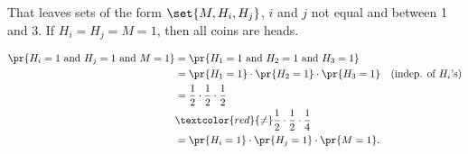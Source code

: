 \begin{problem}
\begin{solution}
  That leaves sets of the form $\set{M, H_i, H_j}$, $i$ and $j$ not equal
  and between 1 and 3.  If $H_i = H_j = M = 1$, then all coins are heads.

\begin{align*}
\pr{H_i=1 \text{ and } H_j = 1 \text{ and } M=1} & = \pr{H_1=1 \text{ and } H_2 = 1 \text{ and } H_3 =1}\\
    & = \pr{H_1=1}\cdot \pr{H_2 = 1} \cdot \pr{H_3 = 1}  & \text{(indep. of $H_i$'s)}\\
    & = \frac{1}{2} \cdot  \frac{1}{2} \cdot \frac{1}{2}\\
    & \textcolor{red}{\neq} \frac{1}{2} \cdot  \frac{1}{2} \cdot \frac{1}{4}\\
    & = \pr{H_i=1}\cdot \pr{H_j=1} \cdot \pr{M=1}.
\end{align*}
\end{solution}
\fi

\eparts
\end{problem}


